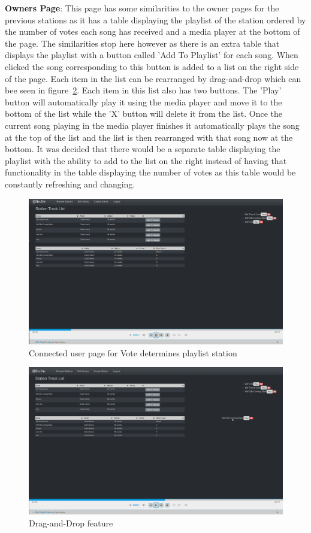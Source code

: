 \documentclass[a4paper, 12pt]{report}
\begin{document}
\textbf{Owners Page}: This page has some similarities to the owner pages for the previous stations as it has a table displaying the playlist of the station ordered by the number of votes each song has received and a media player at the bottom of the page. The similarities stop here however as there is an extra table that displays the playlist with a button called 'Add To Playlist' for each song. When clicked the song corresponding to this button is added to a list on the right side of the page. Each item in the list can be rearranged by drag-and-drop which can bee seen in figure~\ref{drag}. Each item in this list also has two buttons. The 'Play' button will automatically play it using the media player and move it to the bottom of the list while the 'X' button will delete it from the list. Once the current song playing in the media player finishes it automatically plays the song at the top of the list and the list is then rearranged with that song now at the bottom. 
It was decided that there would be a separate table displaying the playlist with the ability to add to the list on the right instead of having that functionality in the table displaying the number of votes as this table would be constantly refreshing and changing.
\begin{figure}[H]
  \centering
    \includegraphics[width=1.0\textwidth]{screenshots/station-type-3-owner.png}
    \caption{Connected user page for Vote determines playlist station}
    \label{station-type-3-owner}
\end{figure}
\begin{figure}[H]
  \centering
    \includegraphics[width=1.0\textwidth]{screenshots/dragging2.png}
    \caption{Drag-and-Drop feature}
    \label{drag}
\end{figure}
\end{document}
